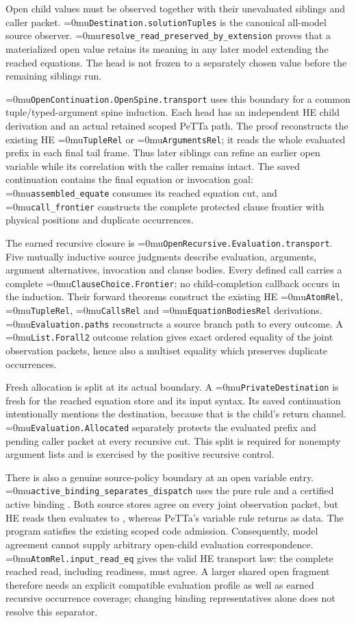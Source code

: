 \documentclass[11pt,a4paper]{article}
\newcommand{\code}[1]{\texttt{\detokenize{#1}}}
\newcommand{\name}[1]{\textup{\Urlmuskip=0mu\relax\nolinkurl{#1}}}
\begin{document}
Open child values must be observed together with their unevaluated siblings
and caller packet. \name{Destination.solutionTuples} is the canonical
all-model source observer. \name{resolve_read_preserved_by_extension} proves
that a materialized open value retains its meaning in any later model
extending the reached equations. The head is not frozen to a separately
chosen value before the remaining siblings run.

\name{OpenContinuation.OpenSpine.transport} uses this boundary for a common
tuple/typed-argument spine induction. Each head has an independent HE child
derivation and an actual retained scoped PeTTa path. The proof reconstructs
the existing HE \name{TupleRel} or \name{ArgumentsRel}; it reads the whole
evaluated prefix in each final tail frame. Thus later siblings can refine an
earlier open variable while its correlation with the caller remains intact.
The saved continuation contains the final equation or invocation goal:
\name{assembled_equate} consumes its reached equation cut, and
\name{call_frontier} constructs the complete protected clause frontier with
physical positions and duplicate occurrences.

The earned recursive closure is
\name{OpenRecursive.Evaluation.transport}. Five mutually inductive source
judgments describe evaluation, arguments, argument alternatives, invocation
and clause bodies. Every defined call carries a complete
\name{ClauseChoice.Frontier}; no child-completion callback occurs in the
induction. Their forward theorems construct the existing HE
\name{AtomRel}, \name{TupleRel}, \name{CallsRel} and
\name{EquationBodiesRel} derivations. \name{Evaluation.paths} reconstructs a
source branch path to every outcome. A \name{List.Forall2} outcome relation
gives exact ordered equality of the joint observation packets, hence also a
multiset equality which preserves duplicate occurrences.

Fresh allocation is split at its actual boundary. A
\name{PrivateDestination} is fresh for the reached equation store and its
input syntax. Its saved continuation intentionally mentions the destination,
because that is the child's return channel. \name{Evaluation.Allocated}
separately protects the evaluated prefix and pending caller packet at every
recursive cut. This split is required for nonempty argument lists and is
exercised by the positive recursive control.

There is also a genuine source-policy boundary at an open variable entry.
\name{active_binding_separates_dispatch} uses the pure rule
\code{(= (f) A)} and a certified active binding \code{x = (f)}. Both source
stores agree on every joint observation packet, but HE reads then evaluates
\code{$x} to \code{A}, whereas PeTTa's variable rule returns \code{(f)} as
data. The program satisfies the existing scoped code admission. Consequently,
model agreement cannot supply arbitrary open-child evaluation correspondence.
\name{AtomRel.input_read_eq} gives the valid HE transport law: the complete
reached read, including readiness, must agree. A larger shared open fragment
therefore needs an explicit compatible evaluation profile as well as earned
recursive occurrence coverage; changing binding representatives alone does
not resolve this separator.
\end{document}

